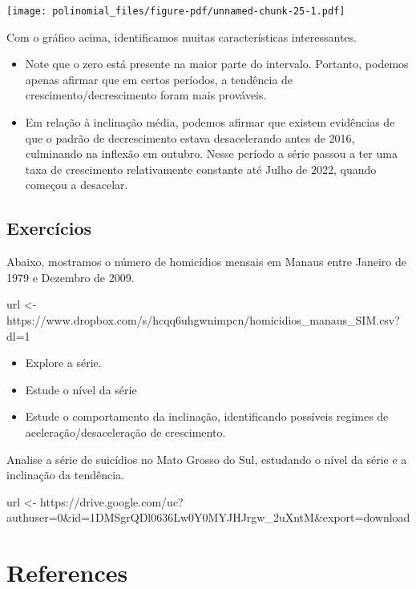 \documentclass[
  letterpaper,
  DIV=11,
  numbers=noendperiod]{scrreprt}
\newenvironment{Shaded}{\begin{snugshade}}{\end{snugshade}}
\newcommand{\NormalTok}[1]{\textcolor[rgb]{0.00,0.23,0.31}{#1}}
\newcommand{\OtherTok}[1]{\textcolor[rgb]{0.00,0.23,0.31}{#1}}
\newcommand{\StringTok}[1]{\textcolor[rgb]{0.13,0.47,0.30}{#1}}
\newlength{\cslhangindent}
\newenvironment{CSLReferences}[2] %
 {\begin{list}{}{%
  \setlength{\itemindent}{0pt}
  \setlength{\leftmargin}{0pt}
  \setlength{\parsep}{0pt}
  \ifodd #1
   \setlength{\leftmargin}{\cslhangindent}
   \setlength{\itemindent}{-1\cslhangindent}
  \fi
  \setlength{\itemsep}{#2\baselineskip}}}
 {\end{list}}
\begin{document}
\texttt{[image: polinomial\_files/figure-pdf/unnamed-chunk-25-1.pdf]}

Com o gráfico acima, identificamos muitas características interessantes.

\begin{itemize}
\item
  Note que o zero está presente na maior parte do intervalo. Portanto,
  podemos apenas afirmar que em certos períodos, a tendência de
  crescimento/decrescimento foram mais prováveis.
\item
  Em relação à inclinação média, podemos afirmar que existem evidências
  de que o padrão de decrescimento estava desacelerando antes de 2016,
  culminando na inflexão em outubro. Nesse período a série passou a ter
  uma taxa de crescimento relativamente constante até Julho de 2022,
  quando começou a desacelar.
\end{itemize}

\section{Exercícios}\label{exercuxedcios-1}

Abaixo, mostramos o número de homicídios mensais em Manaus entre Janeiro
de 1979 e Dezembro de 2009.

\begin{Shaded}
\begin{Highlighting}[]
\NormalTok{url }\OtherTok{\textless{}{-}} \StringTok{\textquotesingle{}https://www.dropbox.com/s/hcqq6uhgwnimpcn/homicidios\_manaus\_SIM.csv?dl=1\textquotesingle{}}
\end{Highlighting}
\end{Shaded}

\begin{itemize}
\item
  Explore a série.
\item
  Estude o nível da série
\item
  Estude o comportamento da inclinação, identificando possíveis regimes
  de aceleração/desaceleração de crescimento.
\end{itemize}

Analise a série de suicídios no Mato Grosso do Sul, estudando o nível da
série e a inclinação da tendência.

\begin{Shaded}
\begin{Highlighting}[]
\NormalTok{url }\OtherTok{\textless{}{-}} \StringTok{\textquotesingle{}https://drive.google.com/uc?authuser=0\&id=1DMSgrQDl0636Lw0Y0MYJHJrgw\_2uXntM\&export=download\textquotesingle{}}
\end{Highlighting}
\end{Shaded}


\chapter*{References}\label{references}


\label{refs}
\begin{CSLReferences}{0}{1}
\end{CSLReferences}
\end{document}
